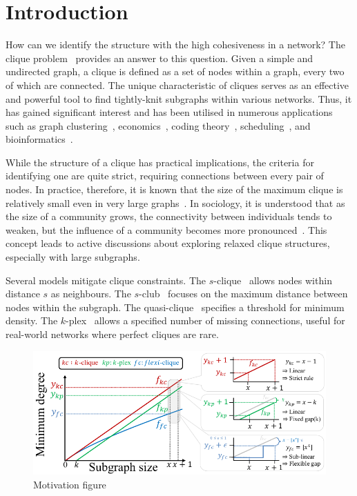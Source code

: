 \documentclass[sigconf]{acmart}
\begin{document}
\section{Introduction}
How can we identify the structure with the high cohesiveness in a network? The clique problem~\cite{luce1949method} provides an answer to this question. Given a simple and undirected graph, a clique is defined as a set of nodes within a graph, every two of which are connected. The unique characteristic of cliques serves as an effective and powerful tool to find tightly-knit subgraphs within various networks. Thus, it has gained significant interest and has been utilised in numerous applications such as graph clustering~\cite{schaeffer2007graph}, economics~\cite{boginski2006mining}, coding theory~\cite{etzion1998greedy}, scheduling~\cite{dorndorf2008modelling}, and bioinformatics~\cite{day1986computational}.


While the structure of a clique has practical implications, the criteria for identifying one are quite strict, requiring connections between every pair of nodes. In practice, therefore, it is known that the size of the maximum clique is relatively small even in very large graphs~\cite{leskovec2020mining, chang2019efficient}. In sociology, it is understood that as the size of a community grows, the connectivity between individuals tends to weaken, but the influence of a community becomes more pronounced~\cite{simmel1950sociology}. This concept leads to active discussions about exploring relaxed clique structures, especially with large subgraphs.

Several models mitigate clique constraints. The $s$-clique~\cite{luce1950connectivity} allows nodes within distance $s$ as neighbours. The $s$-club~\cite{mokken1979cliques} focuses on the maximum distance between nodes within the subgraph. The quasi-clique~\cite{abello2002massive} specifies a threshold for minimum density. The $k$-plex~\cite{seidman1978graph} allows a specified number of missing connections, useful for real-world networks where perfect cliques are rare. 

\begin{figure}[t]
\centering
\includegraphics[width=0.9\linewidth]{figures/motivation_figure.pdf}
\vspace{-0.3cm} 
\caption{Motivation figure} 
\vspace{-1cm} 
\label{fig:motivation}
\end{figure}
\end{document}
